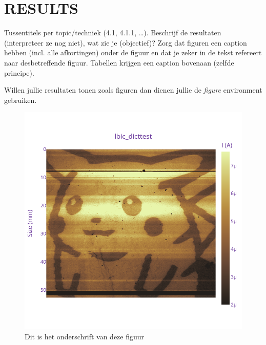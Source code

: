 \section{RESULTS}
Tussentitels per topic/techniek (4.1, 4.1.1, \dots).
Beschrijf de resultaten (interpreteer ze nog niet), wat zie je (objectief)?
Zorg dat figuren een caption hebben (incl. alle afkortingen) onder de figuur en dat je zeker in de tekst refereert naar desbetreffende figuur. 
Tabellen krijgen een caption bovenaan (zelfde principe).

Willen jullie resultaten tonen zoals figuren dan dienen jullie de \textit{figure} environment gebruiken.
\begin{figure}
    \centering
    \includegraphics[width=\linewidth]{Figures/newplot(4).png}
    \caption{Dit is het onderschrift van deze figuur}
    \label{fig:pikachu}
\end{figure}

